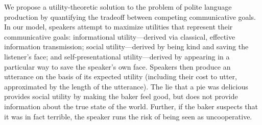 \documentclass[9pt,twocolumn,twoside,lineno]{main_class_file}
\begin{document}
We propose a utility-theoretic solution to the problem of polite language production by quantifying the tradeoff between 
competing communicative goals.
In our model, speakers attempt to maximize utilities that represent their communicative goals:
informational utility---derived via classical, effective
information transmission; social utility---derived by being kind and
saving the listener's face; and self-presentational utility---derived
by appearing in a particular way to save the speaker's own face.
Speakers then produce an utterance on the basis of
its expected utility (including their cost to utter, approximated by
the length of the utterance).
The lie that a pie was delicious provides social utility by making the baker feel good, but does not provide information about the true state of the world. 
Further, if the baker suspects that it was in fact terrible, the speaker runs the risk of being seen as uncooperative.


%
%
\end{document}
